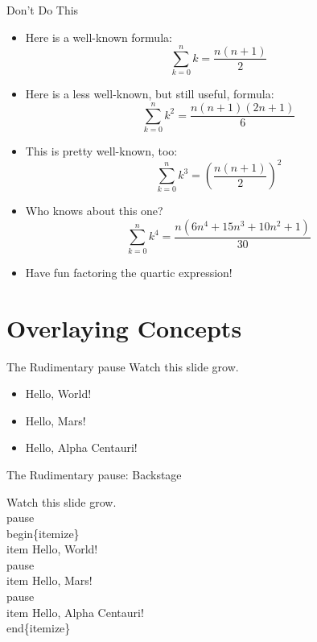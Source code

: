 \documentclass[pdf]{beamer}
\begin{document}
\begin{frame}{Don't Do This}
\begin{itemize}
	\item Here is a well-known formula:\vspace{-.5em}
	$$\displaystyle \sum_{k=0}^{n} k = \frac{n(n+1)}{2}$$
	\item Here is a less well-known, but still useful, formula:\vspace{-.5em}
	$$\displaystyle \sum_{k=0}^{n} k^2 = \frac{n(n+1)(2n+1)}{6}$$
	\item This is pretty well-known, too:\vspace{-.5em}
	$$\displaystyle \sum_{k=0}^{n} k^3 = \left(\frac{n(n+1)}{2}\right)^2$$
	\item Who knows about this one?\vspace{-.5em}
	$$\displaystyle \sum_{k=0}^{n} k^4 = \frac{n(6n^4 + 15n^3 + 10n^2 + 1)}{30}$$
	\item Have fun factoring the quartic expression!
\end{itemize}
\end{frame}

\section{Overlaying Concepts}

\begin{frame}{The Rudimentary pause}
Watch this slide grow.
\pause
\begin{itemize}
	\item Hello, World!
	\pause
	\item Hello, Mars!
	\pause
	\item Hello, Alpha Centauri!
\end{itemize}
\end{frame}

\begin{frame}[fragile]{The Rudimentary pause: Backstage}
\begin{semiverbatim}
Watch this slide grow.
\alert{\\pause}
\\begin\{itemize\}
  \\item Hello, World!
  \alert{\\pause}
  \\item Hello, Mars!
  \alert{\\pause}
  \\item Hello, Alpha Centauri!
\\end\{itemize\}
\end{semiverbatim}
\end{frame}
\end{document}
